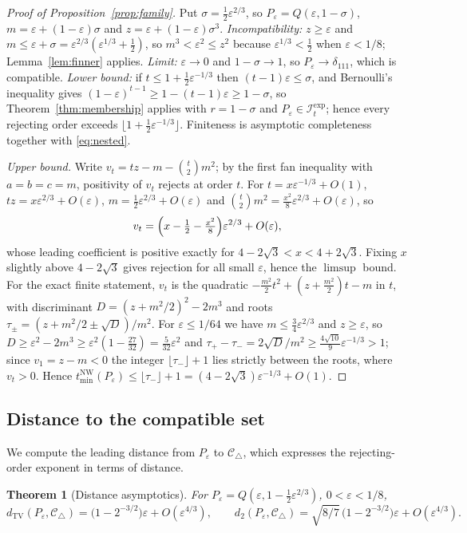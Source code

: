 \documentclass[11pt]{article}
\theoremstyle{plain}
\newtheorem{theorem}{Theorem}[section]
\theoremstyle{definition}
\DeclareMathOperator{\TV}{TV}
\newcommand{\Ctri}{\mathcal C_{\triangle}}
\newcommand{\Iexp}{\mathcal I^{\mathrm{exp}}}
\newcommand{\eps}{\varepsilon}
\newcommand{\tmin}{t_{\min}}
\begin{document}
\begin{proof}[Proof of Proposition~\ref{prop:family}]
Put $\sigma=\tfrac12\eps^{2/3}$, so $P_\eps=Q(\eps,1-\sigma)$, $m=\eps+(1-\eps)\sigma$ and $z=\eps+(1-\eps)\sigma^3$. \emph{Incompatibility:} $z\ge\eps$ and $m\le\eps+\sigma=\eps^{2/3}(\eps^{1/3}+\tfrac12)$, so $m^3<\eps^2\le z^2$ because $\eps^{1/3}<\tfrac12$ when $\eps<1/8$; Lemma~\ref{lem:finner} applies. \emph{Limit:} $\eps\to0$ and $1-\sigma\to1$, so $P_\eps\to\delta_{111}$, which is compatible. \emph{Lower bound:} if $t\le1+\tfrac12\eps^{-1/3}$ then $(t-1)\eps\le\sigma$, and Bernoulli's inequality gives $(1-\eps)^{t-1}\ge1-(t-1)\eps\ge1-\sigma$, so Theorem~\ref{thm:membership} applies with $r=1-\sigma$ and $P_\eps\in\Iexp_t$; hence every rejecting order exceeds $\lfloor1+\tfrac12\eps^{-1/3}\rfloor$. Finiteness is asymptotic completeness together with \eqref{eq:nested}.

\emph{Upper bound.} Write $v_t=tz-m-\binom t2m^2$; by the first fan inequality with $a=b=c=m$, positivity of $v_t$ rejects at order $t$. For $t=x\eps^{-1/3}+O(1)$, $tz=x\eps^{2/3}+O(\eps)$, $m=\tfrac12\eps^{2/3}+O(\eps)$ and $\binom t2m^2=\tfrac{x^2}8\eps^{2/3}+O(\eps)$, so
\[
v_t=\Bigl(x-\tfrac12-\tfrac{x^2}8\Bigr)\eps^{2/3}+O(\eps),
\]
whose leading coefficient is positive exactly for $4-2\sqrt3<x<4+2\sqrt3$. Fixing $x$ slightly above $4-2\sqrt3$ gives rejection for all small $\eps$, hence the $\limsup$ bound. For the exact finite statement, $v_t$ is the quadratic $-\tfrac{m^2}2t^2+(z+\tfrac{m^2}2)t-m$ in $t$, with discriminant $D=(z+m^2/2)^2-2m^3$ and roots $\tau_\pm=(z+m^2/2\pm\sqrt D)/m^2$. For $\eps\le1/64$ we have $m\le\tfrac34\eps^{2/3}$ and $z\ge\eps$, so $D\ge\eps^2-2m^3\ge\eps^2(1-\tfrac{27}{32})=\tfrac5{32}\eps^2$ and $\tau_+-\tau_-=2\sqrt D/m^2\ge\tfrac{4\sqrt{10}}9\eps^{-1/3}>1$; since $v_1=z-m<0$ the integer $\lfloor\tau_-\rfloor+1$ lies strictly between the roots, where $v_t>0$. Hence $\tmin^{\mathrm{NW}}(P_\eps)\le\lfloor\tau_-\rfloor+1=(4-2\sqrt3)\eps^{-1/3}+O(1)$.

\end{proof}

\subsection{Distance to the compatible set}\label{sec:distance}

We compute the leading distance from $P_\eps$ to $\Ctri$, which expresses the rejecting-order exponent in terms of distance.

\begin{theorem}[Distance asymptotics]\label{thm:distance}
For $P_\eps=Q(\eps,1-\tfrac12\eps^{2/3})$, $0<\eps<1/8$,
\[
d_{\TV}(P_\eps,\Ctri)=\bigl(1-2^{-3/2}\bigr)\eps+O(\eps^{4/3}),\qquad
d_2(P_\eps,\Ctri)=\sqrt{8/7}\,\bigl(1-2^{-3/2}\bigr)\eps+O(\eps^{4/3}).
\]
\end{theorem}
\end{document}
